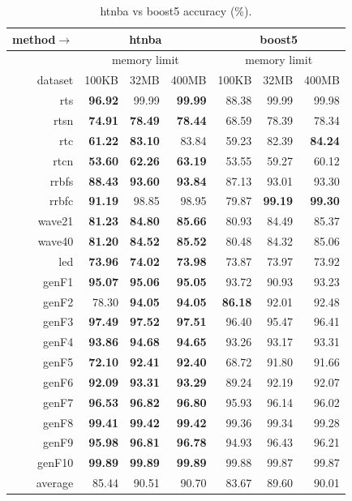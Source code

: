 \begin{table}
\caption{{\sc htnba} vs {\sc boost5} accuracy (\%).}
\label{tab:htnba_vs_boost5_acc}
\centering
\begin{tabular}{|r||r|r|r||r|r|r|}
\hline
method$\rightarrow$ & \multicolumn{3}{|c||}{{\sc htnba}} & \multicolumn{3}{|c|}{{\sc boost5}} \\
\hline
 & \multicolumn{3}{|c||}{memory limit} & \multicolumn{3}{|c|}{memory limit} \\
\hline
dataset & 100KB & 32MB & 400MB & 100KB & 32MB & 400MB \\
\hline
{\sc rts} & \textbf{96.92} & 99.99 & \textbf{99.99} & 88.38 & 99.99 & 99.98 \\
{\sc rtsn} & \textbf{74.91} & \textbf{78.49} & \textbf{78.44} & 68.59 & 78.39 & 78.34 \\
{\sc rtc} & \textbf{61.22} & \textbf{83.10} & 83.84 & 59.23 & 82.39 & \textbf{84.24} \\
{\sc rtcn} & \textbf{53.60} & \textbf{62.26} & \textbf{63.19} & 53.55 & 59.27 & 60.12 \\
{\sc rrbfs} & \textbf{88.43} & \textbf{93.60} & \textbf{93.84} & 87.13 & 93.01 & 93.30 \\
{\sc rrbfc} & \textbf{91.19} & 98.85 & 98.95 & 79.87 & \textbf{99.19} & \textbf{99.30} \\
{\sc wave21} & \textbf{81.23} & \textbf{84.80} & \textbf{85.66} & 80.93 & 84.49 & 85.37 \\
{\sc wave40} & \textbf{81.20} & \textbf{84.52} & \textbf{85.52} & 80.48 & 84.32 & 85.06 \\
{\sc led} & \textbf{73.96} & \textbf{74.02} & \textbf{73.98} & 73.87 & 73.97 & 73.92 \\
{\sc genF1} & \textbf{95.07} & \textbf{95.06} & \textbf{95.05} & 93.72 & 90.93 & 93.23 \\
{\sc genF2} & 78.30 & \textbf{94.05} & \textbf{94.05} & \textbf{86.18} & 92.01 & 92.48 \\
{\sc genF3} & \textbf{97.49} & \textbf{97.52} & \textbf{97.51} & 96.40 & 95.47 & 96.41 \\
{\sc genF4} & \textbf{93.86} & \textbf{94.68} & \textbf{94.65} & 93.26 & 93.17 & 93.31 \\
{\sc genF5} & \textbf{72.10} & \textbf{92.41} & \textbf{92.40} & 68.72 & 91.80 & 91.66 \\
{\sc genF6} & \textbf{92.09} & \textbf{93.31} & \textbf{93.29} & 89.24 & 92.19 & 92.07 \\
{\sc genF7} & \textbf{96.53} & \textbf{96.82} & \textbf{96.80} & 95.93 & 96.14 & 96.02 \\
{\sc genF8} & \textbf{99.41} & \textbf{99.42} & \textbf{99.42} & 99.36 & 99.34 & 99.28 \\
{\sc genF9} & \textbf{95.98} & \textbf{96.81} & \textbf{96.78} & 94.93 & 96.43 & 96.21 \\
{\sc genF10} & \textbf{99.89} & \textbf{99.89} & \textbf{99.89} & 99.88 & 99.87 & 99.87 \\
\hline
average & 85.44 & 90.51 & 90.70 & 83.67 & 89.60 & 90.01 \\
\hline
\end{tabular}
\end{table}

